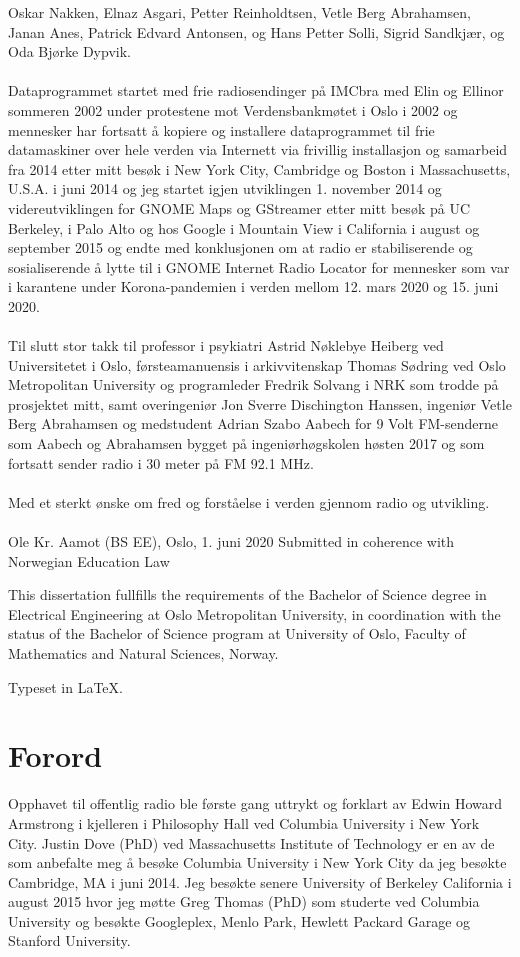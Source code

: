 \documentclass[a4paper,norsk,utf8]{report}
\begin{document}
Oskar Nakken, Elnaz Asgari, Petter Reinholdtsen, Vetle Berg Abrahamsen, Janan Anes, Patrick Edvard Antonsen, og Hans Petter Solli, Sigrid Sandkjær, og Oda Bjørke Dypvik.
\\
\\
Dataprogrammet startet med frie radiosendinger på IMCbra med Elin og
Ellinor sommeren 2002 under protestene mot Verdensbankmøtet i Oslo i
2002 og mennesker har fortsatt å kopiere og installere dataprogrammet
til frie datamaskiner over hele verden via Internett via frivillig
installasjon og samarbeid fra 2014 etter mitt besøk i New York City,
Cambridge og Boston i Massachusetts, U.S.A. i juni 2014 og jeg startet
igjen utviklingen 1. november 2014 og videreutviklingen for GNOME Maps
og GStreamer etter mitt besøk på UC Berkeley, i Palo Alto og hos Google
i Mountain View i California i august og september 2015 og endte med
konklusjonen om at radio er stabiliserende og sosialiserende å lytte
til i GNOME Internet Radio Locator for mennesker som var i karantene
under Korona-pandemien i verden mellom 12. mars 2020 og 15. juni 2020.
\\
\\
\noindent Til slutt stor takk til professor i psykiatri Astrid Nøklebye Heiberg
ved Universitetet i Oslo, førsteamanuensis i arkivvitenskap Thomas
Sødring ved Oslo Metropolitan University og programleder Fredrik
Solvang i NRK som trodde på prosjektet mitt, samt overingeniør Jon Sverre
Dischington Hanssen, ingeniør Vetle Berg Abrahamsen og medstudent 
Adrian Szabo Aabech for 9 Volt FM-senderne som Aabech og Abrahamsen bygget på
ingeniørhøgskolen høsten 2017 og som fortsatt
sender radio i 30 meter på FM 92.1 MHz.
\\
\\
Med et sterkt ønske om fred og forståelse i verden gjennom radio og utvikling.
\\
\\
\noindent Ole Kr. Aamot (BS EE), Oslo, 1. juni 2020
% 
\newpage
Submitted in coherence with Norwegian Education Law

This dissertation fullfills the requirements of the Bachelor of Science
degree in Electrical Engineering at Oslo Metropolitan University, in
coordination with the status of the Bachelor of Science program at
University of Oslo, Faculty of Mathematics and Natural Sciences, Norway.

Typeset in \LaTeX{}.
\newpage
\section*{Forord}
Opphavet til offentlig radio ble første gang uttrykt og forklart av
Edwin Howard Armstrong i kjelleren i Philosophy Hall ved Columbia
University i New York City.  Justin Dove (PhD) ved Massachusetts
Institute of Technology er en av de som anbefalte meg å besøke
Columbia University i New York City da jeg besøkte Cambridge, MA i
juni 2014.  Jeg besøkte senere University of Berkeley California i
august 2015 hvor jeg møtte Greg Thomas (PhD) som studerte ved Columbia
University og besøkte Googleplex, Menlo Park, Hewlett Packard Garage og
Stanford University.
\end{document}
